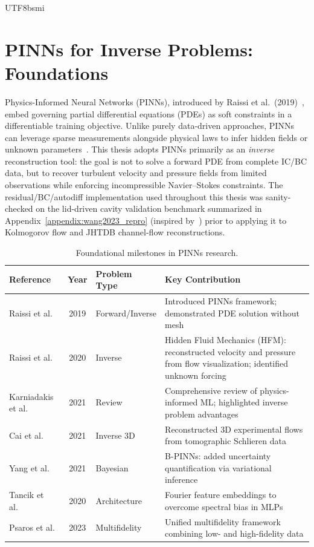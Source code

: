 \documentclass[master]{NTHUthesis}
\begin{document}
\begin{CJK*}{UTF8}{bsmi}
\section{PINNs for Inverse Problems: Foundations}
\label{sec:pinns_foundations}

Physics-Informed Neural Networks (PINNs), introduced by Raissi et al.\ (2019)~\cite{Raissi2019JCP}, embed governing partial differential equations (PDEs) as soft constraints in a differentiable training objective. Unlike purely data-driven approaches, PINNs can leverage sparse measurements alongside physical laws to infer hidden fields or unknown parameters~\cite{Karniadakis2021NRP}. This thesis adopts PINNs primarily as an \emph{inverse} reconstruction tool: the goal is not to solve a forward PDE from complete IC/BC data, but to recover turbulent velocity and pressure fields from limited observations while enforcing incompressible Navier--Stokes constraints.
The residual/BC/autodiff implementation used throughout this thesis was sanity-checked on the lid-driven cavity validation benchmark summarized in Appendix~\ref{appendix:wang2023_repro} (inspired by~\cite{wang2023solutionmultiplicityeffectsdata}) prior to applying it to Kolmogorov flow and JHTDB channel-flow reconstructions.

\begin{table}[!htbp]
    \centering
    \caption{Foundational milestones in PINNs research.}
    \label{tab:pinns_foundations}
    \small
    \begin{tabularx}{\textwidth}{
        >{\raggedright\arraybackslash}p{2.8cm}
        c
        >{\raggedright\arraybackslash}p{2.6cm}
        X
    }
    \toprule
    \textbf{Reference} & \textbf{Year} & \textbf{Problem Type} & \textbf{Key Contribution} \\
    \midrule
    Raissi et al.~\cite{Raissi2019JCP} & 2019 & Forward/Inverse & Introduced PINNs framework; demonstrated PDE solution without mesh \\
    Raissi et al.~\cite{Raissi2020Science} & 2020 & Inverse & Hidden Fluid Mechanics (HFM): reconstructed velocity and pressure from flow visualization; identified unknown forcing \\
    Karniadakis et al.~\cite{Karniadakis2021NRP} & 2021 & Review & Comprehensive review of physics-informed ML; highlighted inverse problem advantages \\
    Cai et al.~\cite{Cai2021JFM} & 2021 & Inverse 3D & Reconstructed 3D experimental flows from tomographic Schlieren data \\
    Yang et al.~\cite{Yang2021JCP} & 2021 & Bayesian & B-PINNs: added uncertainty quantification via variational inference \\
    Tancik et al.~\cite{tancik2020fourierfeaturesletnetworks} & 2020 & Architecture & Fourier feature embeddings to overcome spectral bias in MLPs \\
    Psaros et al.~\cite{Psaros2023JCP} & 2023 & Multifidelity & Unified multifidelity framework combining low- and high-fidelity data \\
    \bottomrule
    \end{tabularx}
\end{table}
\FloatBarrier


\end{CJK*}
\end{document}
